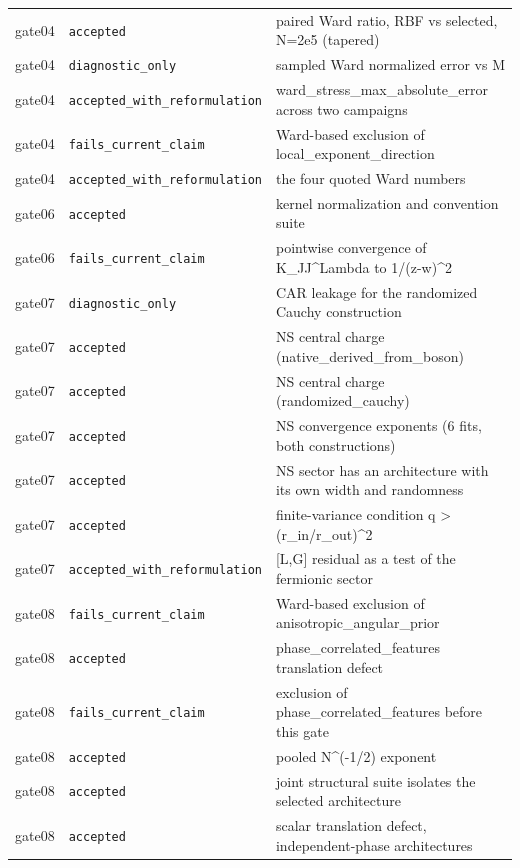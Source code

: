 \begin{tabular}{llp{}}
gate04 & \texttt{accepted} & paired Ward ratio, RBF vs selected, N=2e5 (tapered) \\
gate04 & \texttt{diagnostic\_only} & sampled Ward normalized error vs M \\
gate04 & \texttt{accepted\_with\_reformulation} & ward\_stress\_max\_absolute\_error across two campaigns \\
gate04 & \texttt{fails\_current\_claim} & Ward-based exclusion of local\_exponent\_direction \\
gate04 & \texttt{accepted\_with\_reformulation} & the four quoted Ward numbers \\
gate06 & \texttt{accepted} & kernel normalization and convention suite \\
gate06 & \texttt{fails\_current\_claim} & pointwise convergence of K\_JJ\textasciicircum{}Lambda to 1/(z-w)\textasciicircum{}2 \\
gate07 & \texttt{diagnostic\_only} & CAR leakage for the randomized Cauchy construction \\
gate07 & \texttt{accepted} & NS central charge (native\_derived\_from\_boson) \\
gate07 & \texttt{accepted} & NS central charge (randomized\_cauchy) \\
gate07 & \texttt{accepted} & NS convergence exponents (6 fits, both constructions) \\
gate07 & \texttt{accepted} & NS sector has an architecture with its own width and randomness \\
gate07 & \texttt{accepted} & finite-variance condition q > (r\_in/r\_out)\textasciicircum{}2 \\
gate07 & \texttt{accepted\_with\_reformulation} & [L,G] residual as a test of the fermionic sector \\
gate08 & \texttt{fails\_current\_claim} & Ward-based exclusion of anisotropic\_angular\_prior \\
gate08 & \texttt{accepted} & phase\_correlated\_features translation defect \\
gate08 & \texttt{fails\_current\_claim} & exclusion of phase\_correlated\_features before this gate \\
gate08 & \texttt{accepted} & pooled N\textasciicircum{}(-1/2) exponent \\
gate08 & \texttt{accepted} & joint structural suite isolates the selected architecture \\
gate08 & \texttt{accepted} & scalar translation defect, independent-phase architectures \\
\hline
\end{tabular}
